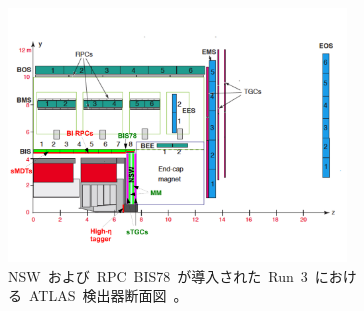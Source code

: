 \begin{figure}[H]
        \centering   
        \includegraphics[width=0.8\textwidth,page=1]{img/pdf/ch01_fig_03a.pdf}
        \caption[NSW~および~RPC~BIS78~が導入された~Run~3~における~ATLAS~検出器断面図]{NSW~および~RPC~BIS78~が導入された~Run~3~における~ATLAS~検出器断面図~\cite{TR:04}。}
        \label{fig:cut3}
\end{figure}

